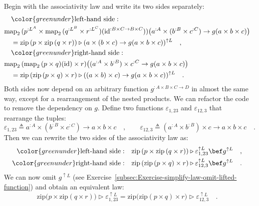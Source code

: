 Begin with the associativity law and write its two sides separately:
\begin{align*}
 & \quad{\color{greenunder}\text{left-hand side}:}\quad\\
 & \text{map}_{2}\,(p^{:L^{A}}\times\text{map}_{2}\,(q^{:L^{B}}\times r^{:L^{C}})(\text{id}^{:B\times C\rightarrow B\times C}))\big(a^{:A}\times(b^{:B}\times c^{:C})\rightarrow g(a\times b\times c)\big)\\
 & \quad=\text{zip}\,(p\times\text{zip}\,(q\times r))\triangleright(a\times(b\times c)\rightarrow g(a\times b\times c))^{\uparrow L}\quad,\\
 & \quad{\color{greenunder}\text{right-hand side}:}\quad\\
 & \text{map}_{2}\,(\text{map}_{2}\,(p\times q)(\text{id})\times r)\big((a^{:A}\times b^{:B})\times c^{:C}\rightarrow g(a\times b\times c)\big)\\
 & \quad=\text{zip}\,(\text{zip}\,(p\times q)\times r)\triangleright((a\times b)\times c)\rightarrow g(a\times b\times c))^{\uparrow L}\quad.
\end{align*}
Both sides now depend on an arbitrary function $g^{:A\times B\times C\rightarrow D}$
in almost the same way, except for a rearrangement of the nested products.
We can refactor the code to remove the dependency on $g$. Define
two functions $\varepsilon_{1,23}$ and $\varepsilon_{12,3}$ that
rearrange the tuples:
\[
\varepsilon_{1,23}\triangleq a^{:A}\times(b^{:B}\times c^{:C})\rightarrow a\times b\times c\quad,\quad\quad\varepsilon_{12,3}\triangleq(a^{:A}\times b^{:B})\times c\rightarrow a\times b\times c\quad.
\]
Then we can rewrite the two sides of the associativity law as:
\begin{align*}
{\color{greenunder}\text{left-hand side}:}\quad & \text{zip}\,(p\times\text{zip}\,(q\times r))\triangleright\varepsilon_{1,23}^{\uparrow L}\bef g^{\uparrow L}\quad,\\
{\color{greenunder}\text{right-hand side}:}\quad & \text{zip}\,(\text{zip}\,(p\times q)\times r)\triangleright\varepsilon_{12,3}^{\uparrow L}\bef g^{\uparrow L}\quad.
\end{align*}
We can now omit $g^{\uparrow L}$ (see Exercise~\ref{subsec:Exercise-simplify-law-omit-lifted-function})
and obtain an equivalent law:
\begin{equation}
\text{zip}\big(p\times\text{zip}\left(q\times r\right)\big)\triangleright\varepsilon_{1,23}^{\uparrow L}=\text{zip}\big(\text{zip}\left(p\times q\right)\times r\big)\triangleright\varepsilon_{12,3}^{\uparrow L}\quad.\label{eq:zip-associativity-law-with-epsilons}
\end{equation}
